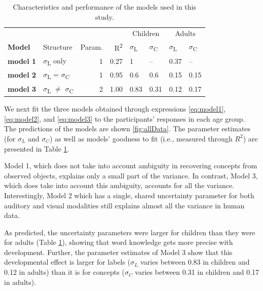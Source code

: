 \documentclass[english,,man,floatsintext]{apa6}
\theoremstyle{definition}
\theoremstyle{definition}
\theoremstyle{definition}
\theoremstyle{remark}
\begin{document}
\begin{table}

\caption{\label{tab:models}Characteristics and performance of the models used in this study.}
\centering
\begin{tabular}[t]{>{\bfseries}llrrllll}
\toprule
\multicolumn{1}{c}{} & \multicolumn{1}{c}{} & \multicolumn{1}{c}{} & \multicolumn{1}{c}{} & \multicolumn{2}{c}{Children} & \multicolumn{2}{c}{Adults} \\
\cmidrule(l{2pt}r{2pt}){5-6} \cmidrule(l{2pt}r{2pt}){7-8}
Model & Structure & Param. & R\textsuperscript{2} & $\sigma$\textsubscript{L} & $\sigma$\textsubscript{C} & $\sigma$\textsubscript{L} & $\sigma$\textsubscript{C}\\
\midrule
model 1 & $\sigma$\textsubscript{L} only & 1 & 0.27 & 1 & -- & 0.37 & --\\
model 2 & $\sigma$\textsubscript{L} = $\sigma$\textsubscript{C} & 1 & 0.95 & 0.6 & 0.6 & 0.15 & 0.15\\
model 3 & $\sigma$\textsubscript{L} $\neq$ $\sigma$\textsubscript{C} & 2 & 1.00 & 0.83 & 0.31 & 0.12 & 0.17\\
\bottomrule
\end{tabular}
\end{table}

We next fit the three models obtained through expressions
\ref{eq:model1}, \ref{eq:model2}, and \ref{eq:model3} to the
participants' responses in each age group. The predictions of the models
are shown \ref{fig:allData}. The parameter estimates (for \(\sigma_L\)
and \(\sigma_C\)) as well as models' goodness to fit (i.e., measured
through \(R^2\)) are presented in Table \ref{tab:models}.

Model 1, which does not take into account ambiguity in recovering
concepts from observed objects, explains only a small part of the
variance. In contrast, Model 3, which does take into account this
ambiguity, accounts for all the variance. Interestingly, Model 2 which
has a single, shared uncertainty parameter for both auditory and visual
modalities still explains almost all the variance in human data.

As predicted, the uncertainty parameters were larger for children than
they were for adults (Table \ref{tab:models}), showing that word
knowledge gets more precise with development. Further, the parameter
estimates of Model 3 show that this developmental effect is larger for
labels (\(\sigma_L\) varies between 0.83 in children and 0.12 in adults)
than it is for concepts (\(\sigma_C\) varies between 0.31 in children
and 0.17 in adults).
\end{document}
